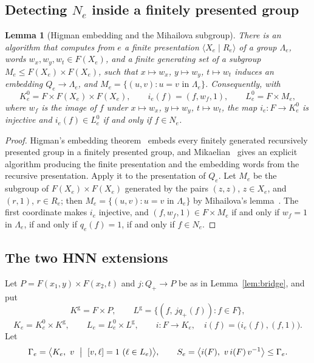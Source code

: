 \documentclass[11pt]{amsart}
\newcommand{\leanverified}[2]{\ignorespaces}
\newtheorem{lemma}[theorem]{Lemma}
\theoremstyle{remark}
\theoremstyle{plain}
\begin{document}
\subsection*{Detecting \texorpdfstring{$N_e$}{N-e} inside a finitely presented group}

\begin{lemma}[Higman embedding and the Mihailova subgroup]\label{lem:mikhailova}
There is an algorithm that computes from $e$ a finite presentation
$\langle X_e\mid R_e\rangle$ of a group $\Lambda_e$, words
$w_x,w_y,w_t\in F(X_e)$, and a finite generating set of a subgroup
$M_e\le F(X_e)\times F(X_e)$, such that $x\mapsto w_x$, $y\mapsto w_y$,
$t\mapsto w_t$ induces an embedding $Q_e\to\Lambda_e$, and
$M_e=\{(u,v):u=v\text{ in }\Lambda_e\}$.  Consequently, with
\[
 K^0_e=F\times F(X_e)\times F(X_e),
 \qquad
 i_e(f)=(f,w_f,1),
 \qquad
 L^0_e=F\times M_e,
\]
where $w_f$ is the image of $f$ under $x\mapsto w_x$, $y\mapsto w_y$,
$t\mapsto w_t$, the map $i_e\colon F\to K^0_e$ is injective and
$i_e(f)\in L^0_e$ if and only if $f\in N_e$.
\end{lemma}

\begin{proof}
Higman's embedding theorem~\cite{Higman} embeds every finitely generated
recursively presented group in a finitely presented group, and
Mikaelian~\cite{Mikaelian} gives an explicit algorithm producing the finite
presentation and the embedding words from the recursive presentation.
Apply it to the presentation of $Q_e$.  Let $M_e$ be the subgroup of
$F(X_e)\times F(X_e)$ generated by the pairs $(z,z)$, $z\in X_e$, and
$(r,1)$, $r\in R_e$; then $M_e=\{(u,v):u=v\text{ in }\Lambda_e\}$ by
Mihailova's lemma~\cite{Mihailova}.  The first coordinate makes $i_e$
\leanverified{Manuscript/MFRecognition/MarkedHigmanOutput}{GroupApproximation.Manuscript.MFRecognition.HigmanCompiler.MarkedHigmanOutput.mem_mihailova_iff}
injective, and $(f,w_f,1)\in F\times M_e$ if and only if $w_f=1$ in
$\Lambda_e$, if and only if $q_e(f)=1$, if and only if $f\in N_e$.
\end{proof}

\subsection*{The two HNN extensions}

Let $P=F(x_1,y)\times F(x_2,t)$ and $j\colon Q_+\to P$ be as in
Lemma~\ref{lem:bridge}, and put
\[
 K^{\mathrm g}=F\times P,
 \qquad
 L^{\mathrm g}=\{(f,\,jq_+(f)):f\in F\},
\]
\[
 K_e=K^0_e\times K^{\mathrm g},
 \qquad
 L_e=L^0_e\times L^{\mathrm g},
 \qquad
 i\colon F\to K_e,\quad i(f)=\bigl(i_e(f),(f,1)\bigr).
\]
Let
\begin{equation}\label{eq:central-rope}
 \Gamma_e=\bigl\langle K_e,\ v\ \bigm|\ [v,\ell]=1\ (\ell\in L_e)\bigr\rangle,
 \qquad
 S_e=\bigl\langle i(F),\ v\,i(F)\,v^{-1}\bigr\rangle\le\Gamma_e.
\end{equation}
\end{document}
